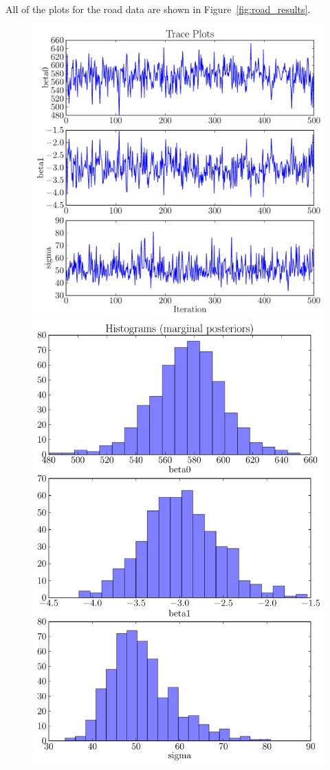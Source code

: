 All of the plots for the road data are shown in Figure~\ref{fig:road_results}.
\begin{figure}[ht!]
\begin{center}
\includegraphics[scale=0.35]{Figures/road_trace.pdf}
\includegraphics[scale=0.35]{Figures/road_hist.pdf}

\end{center}
\end{figure}

